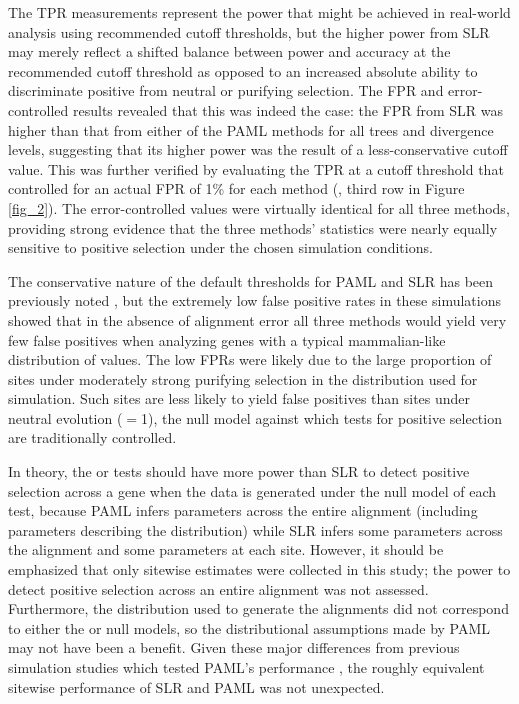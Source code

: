 The TPR measurements represent the power that might be achieved in
real-world analysis using recommended cutoff thresholds, but the
higher power from SLR may merely reflect a shifted balance between
power and accuracy at the recommended cutoff threshold as opposed to
an increased absolute ability to discriminate positive from neutral or
purifying selection. The FPR and error-controlled \tpr results
revealed that this was indeed the case: the FPR from SLR was higher
than that from either of the PAML methods for all trees and divergence
levels, suggesting that its higher power was the result of a
less-conservative cutoff value. This was further verified by
evaluating the TPR at a cutoff threshold that controlled for an actual
FPR of 1\% for each method (\tpr{}, third row in Figure
\ref{fig_2}). The error-controlled \tpr values were virtually
identical for all three methods, providing strong evidence that the
three methods' \sw statistics were nearly equally sensitive to
positive selection under the chosen simulation conditions.

The conservative nature of the default thresholds for PAML and SLR has
been previously noted
\citep{Anisimova2002,Yang2005Bayes,Massingham2005}, but the extremely
low false positive rates in these simulations showed that in the
absence of alignment error all three methods would yield very few
false positives when analyzing genes with a typical mammalian-like
distribution of \omg values. The low FPRs were likely due to the large
proportion of sites under moderately strong purifying selection in the
\omg distribution used for simulation. Such sites are less likely to
yield false positives than sites under neutral evolution (\omg$=$1), the
null model against which tests for positive selection are
traditionally controlled.


In theory, the \mtwo or \meight tests should have more power than SLR
to detect positive selection across a gene when the data is generated
under the null model of each test, because PAML infers parameters
across the entire alignment (including parameters describing the \omg
distribution) while SLR infers some parameters across the alignment
and some parameters at each site. However, it should be emphasized
that only sitewise estimates were collected in this study; the power
to detect positive selection across an entire alignment was not
assessed. Furthermore, the \omg distribution used to generate the
alignments did not correspond to either the \mtwo or \meight null
models, so the distributional assumptions made by PAML may not have
been a benefit. Given these major differences from previous simulation
studies which tested PAML's performance
\citep{Anisimova2002,Pond2005a}, the roughly equivalent sitewise
performance of SLR and PAML was not unexpected.

